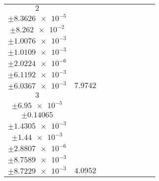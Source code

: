 \documentclass[8pt]{article}
\begin{document}
\begin{longtable}[l]{c c c c c c c c c}
$\num{2}$ & \begin{tabular}[c]{@{}c@{}}$\num{6.0211e-2}$ \\ $\pm\num{8.3626e-5}$\end{tabular} & \begin{tabular}[c]{@{}c@{}}$\num{-0.51207}$ \\ $\pm\num{8.262e-2}$\end{tabular} & \begin{tabular}[c]{@{}c@{}}$\num{-7.1688}$ \\ $\pm\num{1.0076e-3}$\end{tabular} & \begin{tabular}[c]{@{}c@{}}$\num{1.1725e+3}$ \\ $\pm\num{1.0109e-3}$\end{tabular} & \begin{tabular}[c]{@{}c@{}}$\num{2.3457}$ \\ $\pm\num{2.0224e-6}$\end{tabular} & \begin{tabular}[c]{@{}c@{}}$\num{3.7847}$ \\ $\pm\num{6.1192e-3}$\end{tabular} & \begin{tabular}[c]{@{}c@{}}$\num{3.7652}$ \\ $\pm\num{6.0367e-3}$\end{tabular} & $\num{7.9742}$\\
$\num{3}$ & \begin{tabular}[c]{@{}c@{}}$\num{2.9249e-2}$ \\ $\pm\num{6.95e-5}$\end{tabular} & \begin{tabular}[c]{@{}c@{}}$\num{0.66197}$ \\ $\pm\num{0.14065}$\end{tabular} & \begin{tabular}[c]{@{}c@{}}$\num{-2.9483}$ \\ $\pm\num{1.4305e-3}$\end{tabular} & \begin{tabular}[c]{@{}c@{}}$\num{1.1767e+3}$ \\ $\pm\num{1.44e-3}$\end{tabular} & \begin{tabular}[c]{@{}c@{}}$\num{2.3541}$ \\ $\pm\num{2.8807e-6}$\end{tabular} & \begin{tabular}[c]{@{}c@{}}$\num{3.1416}$ \\ $\pm\num{8.7589e-3}$\end{tabular} & \begin{tabular}[c]{@{}c@{}}$\num{3.1409}$ \\ $\pm\num{8.7229e-3}$\end{tabular} & $\num{4.0952}$\\

\end{longtable}
\end{document}
